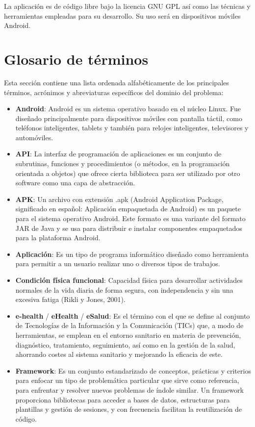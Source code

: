 La aplicación es de código libre bajo la licencia GNU GPL así como las técnicas y herramientas empleadas para su desarrollo. Su uso será en dispositivos móviles Android.

\section{Glosario de términos}

Esta sección contiene una lista ordenada alfabéticamente de los principales términos, acrónimos y abreviaturas específicos del dominio del problema:

\begin{itemize}
\item \textbf{Android}: Android es un sistema operativo basado en el núcleo Linux. Fue diseñado principalmente para dispositivos móviles con pantalla táctil, como teléfonos inteligentes, tablets y también para relojes inteligentes, televisores y automóviles.
\item \textbf{API}: La interfaz de programación de aplicaciones es un conjunto de subrutinas, funciones y procedimientos (o métodos, en la programación orientada a objetos) que ofrece cierta biblioteca para ser utilizado por otro software como una capa de abstracción.
\item \textbf{APK}: Un archivo con extensión .apk (Android Application Package, significado en español: Aplicación empaquetada de Android) es un paquete para el sistema operativo Android. Este formato es una variante del formato JAR de Java y se usa para distribuir e instalar componentes empaquetados para la plataforma Android.
\item \textbf{Aplicación}: Es un tipo de programa informático diseñado como herramienta para permitir a un usuario realizar uno o diversos tipos de trabajos.
\item \textbf{Condición física funcional}: Capacidad física para desarrollar actividades normales de la vida diaria de forma segura, con independencia y sin una excesiva fatiga (Rikli y Jones, 2001).
\item \textbf{e-health} / \textbf{eHealth} / \textbf{eSalud}: Es el término con el que se define al conjunto de Tecnologías de la Información y la Comunicación (TICs) que, a modo de herramientas, se emplean en el entorno sanitario en materia de prevención, diagnóstico, tratamiento, seguimiento, así como en la gestión de la salud, ahorrando costes al sistema sanitario y mejorando la eficacia de este.
\item \textbf{Framework}: Es un conjunto estandarizado de conceptos, prácticas y criterios para enfocar un tipo de problemática particular que sirve como referencia, para enfrentar y resolver nuevos problemas de índole similar. Un framework proporciona bibliotecas para acceder a bases de datos, estructuras para plantillas y gestión de sesiones, y con frecuencia facilitan la reutilización de código.

\end{itemize}

